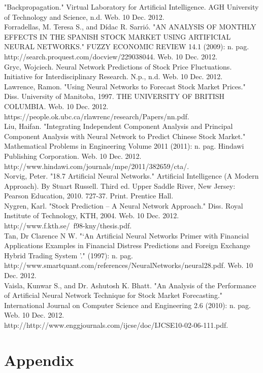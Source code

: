\documentclass[a4paper,11pt]{article}
\begin{document}
"Backpropagation." Virtual Laboratory for Artificial Intelligence. AGH University of Technology and Science, n.d. Web. 10 Dec. 2012.\\


Forradellas, M. Teresa S., and Dídac R. Sarrió. "AN ANALYSIS OF MONTHLY EFFECTS IN THE SPANISH STOCK MARKET USING ARTIFICIAL NEURAL NETWORKS." FUZZY ECONOMIC REVIEW 14.1 (2009): n. pag.\\ http://search.proquest.com/docview/229038044. Web. 10 Dec. 2012.\\

Gryc, Wojciech. Neural Network Predictions of Stock Price Fluctuations. Initiative for Interdisciplinary Research. N.p., n.d. Web. 10 Dec. 2012.\\

Lawrence, Ramon. "Using Neural Networks to Forecast Stock Market Prices." Diss. University of Manitoba, 1997. THE UNIVERSITY OF BRITISH COLUMBIA. Web. 10 Dec. 2012. https://people.ok.ubc.ca/rlawrenc/research/Papers/nn.pdf.\\

Liu, Haifan. "Integrating Independent Component Analysis and Principal Component Analysis with Neural Network to Predict Chinese Stock Market." Mathematical Problems in Engineering Volume 2011 (2011): n. pag. Hindawi Publishing Corporation. Web. 10 Dec. 2012.\\ http://www.hindawi.com/journals/mpe/2011/382659/cta/.\\

Norvig, Peter. "18.7 Artificial Neural Networks." Artificial Intelligence (A Modern Approach). By Stuart Russell. Third ed. Upper Saddle River, New Jersey: Pearson Education, 2010. 727-37. Print. Prentice Hall.\\

Nygren, Karl. "Stock Prediction – A Neural Network Approach." Diss. Royal Institute of Technology, KTH, 2004. Web. 10 Dec. 2012. http://www.f.kth.se/~f98-kny/thesis.pdf.\\

Tan, Dr Clarence N W. "‘An Artificial Neural Networks Primer with Financial Applications Examples in Financial Distress Predictions and Foreign Exchange Hybrid Trading System ’." (1997): n. pag.\\ http://www.smartquant.com/references/NeuralNetworks/neural28.pdf. Web. 10 Dec. 2012. \\

Vaisla, Kunwar S., and Dr. Ashutosh K. Bhatt. "An Analysis of the Performance of Artificial Neural Network Technique for Stock Market Forecasting." International Journal on Computer Science and Engineering 2.6 (2010): n. pag. Web. 10 Dec. 2012.\\ http://http://www.enggjournals.com/ijcse/doc/IJCSE10-02-06-111.pdf.\\

\section{Appendix}
\end{document}
